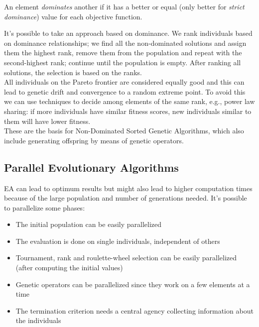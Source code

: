 \begin{definition}
	An element \textit{dominates} another if it has a better or equal (only better for \textit{strict dominance}) value for each objective function.\\
\end{definition}

It's possible to take an approach based on dominance. We rank individuals based on dominance relationships; we find all the non-dominated solutions and assign them the highest rank, remove them from the population and repeat with the second-highest rank; continue until the population is empty. After ranking all solutions, the selection is based on the ranks.\\

All individuals on the Pareto frontier are considered equally good and this can lead to genetic drift and convergence to a random extreme point. To avoid this we can use techniques to decide among elements of the same rank, e.g., power law sharing: if more individuals have similar fitness scores, new individuals similar to them will have lower fitness.\\

These are the basis for Non-Dominated Sorted Genetic Algorithms, which also include generating offspring by means of genetic operators.\\

\subsection{Parallel Evolutionary Algorithms}
EA can lead to optimum results but might also lead to higher computation times because of the large population and number of generations needed. It's possible to parallelize some phases: 
\begin{itemize}
	\item The initial population can be easily parallelized
	\item The evaluation is done on single individuals, independent of others 
	\item Tournament, rank and roulette-wheel selection can be easily parallelized (after computing the initial values)
	\item Genetic operators can be parallelized since they work on a few elements at a time
	\item The termination criterion needs a central agency collecting information about the individuals
\end{itemize} 

